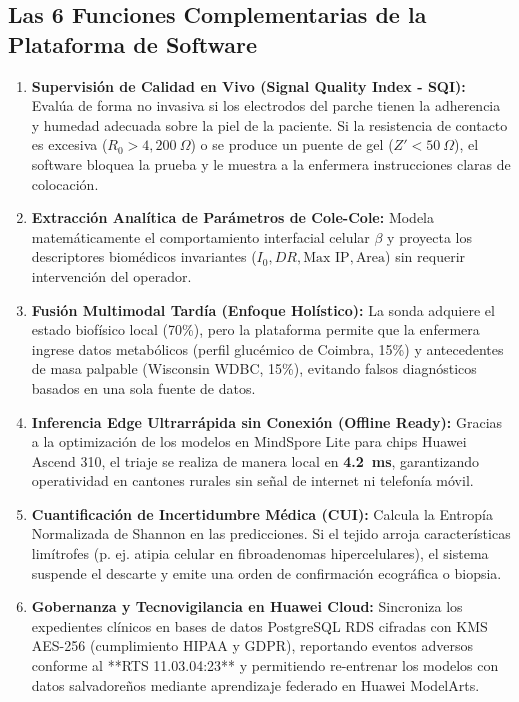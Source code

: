 \documentclass[11pt,a4paper]{article}
\begin{document}
\subsection{Las 6 Funciones Complementarias de la Plataforma de Software}
\begin{enumerate}
    \item \textbf{Supervisión de Calidad en Vivo (Signal Quality Index - SQI):} Evalúa de forma no invasiva si los electrodos del parche tienen la adherencia y humedad adecuada sobre la piel de la paciente. Si la resistencia de contacto es excesiva ($R_0 > 4,200\ \Omega$) o se produce un puente de gel ($Z' < 50\ \Omega$), el software bloquea la prueba y le muestra a la enfermera instrucciones claras de colocación.
    \item \textbf{Extracción Analítica de Parámetros de Cole-Cole:} Modela matemáticamente el comportamiento interfacial celular $\beta$ y proyecta los descriptores biomédicos invariantes ($I_0, DR, \text{Max IP}, \text{Area}$) sin requerir intervención del operador.
    \item \textbf{Fusión Multimodal Tardía (Enfoque Holístico):} La sonda adquiere el estado biofísico local (70\%), pero la plataforma permite que la enfermera ingrese datos metabólicos (perfil glucémico de Coimbra, 15\%) y antecedentes de masa palpable (Wisconsin WDBC, 15\%), evitando falsos diagnósticos basados en una sola fuente de datos.
    \item \textbf{Inferencia Edge Ultrarrápida sin Conexión (Offline Ready):} Gracias a la optimización de los modelos en MindSpore Lite para chips Huawei Ascend 310, el triaje se realiza de manera local en \textbf{4.2~ms}, garantizando operatividad en cantones rurales sin señal de internet ni telefonía móvil.
    \item \textbf{Cuantificación de Incertidumbre Médica (CUI):} Calcula la Entropía Normalizada de Shannon en las predicciones. Si el tejido arroja características limítrofes (p. ej. atipia celular en fibroadenomas hipercelulares), el sistema suspende el descarte y emite una orden de confirmación ecográfica o biopsia.
    \item \textbf{Gobernanza y Tecnovigilancia en Huawei Cloud:} Sincroniza los expedientes clínicos en bases de datos PostgreSQL RDS cifradas con KMS AES-256 (cumplimiento HIPAA y GDPR), reportando eventos adversos conforme al **RTS 11.03.04:23** y permitiendo re-entrenar los modelos con datos salvadoreños mediante aprendizaje federado en Huawei ModelArts.
\end{enumerate}
\end{document}
